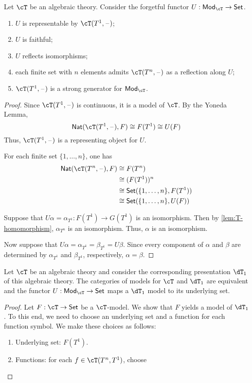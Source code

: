 \documentclass{amsart}
\begin{document}
\begin{lem}
  Let $\cT$ be an algebraic theory.
  Consider the forgetful functor $U : \mathsf{Mod}_{\cT} \to \mathsf{Set}$.
  \begin{enumerate}
  \item $U$ is representable by $\cT(T^{1}, \blank)$;
  \item $U$ is faithful;
  \item $U$ reflects isomorphisms;
  \item each finite set with $n$ elements admits $\cT(T^{n}, \blank)$ as a reflection along $U$;
  \item $\cT(T^{1}, \blank)$ is a strong generator for $\mathsf{Mod}_{\cT}$.
  \end{enumerate}
\end{lem}
\begin{proof}
  Since $\cT(T^{1},\blank)$ is continuous, it is a model of $\cT$.
  By the Yoneda Lemma,
  \[
    \mathsf{Nat}(\cT(T^{1}, \blank), F) \iso F(T^{1}) \iso U(F)
  \]
  Thus, $\cT(T^{1},\blank)$ is a representing object for $U$.

  For each finite set $\{1,\ldots,n\}$, one has
  \begin{align}
    \mathsf{Nat}(\cT(T^{n},\blank), F) &\iso F(T^{n})\\
                                       &\iso (F(T^{1}))^{n}\\
                                       &\iso \mathsf{Set}(\{1,\ldots,n\}, F(T^{1}))\\
                                       &\iso \mathsf{Set}(\{1,\ldots,n\}, U(F))
  \end{align}

  Suppose that $U\alpha = \alpha_{T^{1}} : F(T^{1}) \to G(T^{1})$ is an isomorphism.
  Then by \cref{lem:T-homomorphism}, $\alpha_{T^{n}}$ is an isomorphism.
  Thus, $\alpha$ is an isomorphism.

  Now suppose that $U\alpha = \alpha_{T^{1}} = \beta_{T^{1}} = U\beta$.
  Since every component of $\alpha$ and $\beta$ are determined by $\alpha_{T^{1}}$ and $\beta_{T^{1}}$, respectively, $\alpha = \beta$.
\end{proof}

\begin{lem}
  Let $\cT$ be an algebraic theory and consider the corresponding presentation $\dT_{1}$ of this algebraic theory.
  The categories of models for $\cT$ and $\dT_{1}$ are equivalent and the functor $U : \mathsf{Mod}_{\cT} \to \mathsf{Set}$ maps a $\dT_{1}$ model to its underlying set.
\end{lem}
\begin{proof}
  Let $F : \cT \to \mathsf{Set}$ be a $\cT$-model.
  We show that $F$ yields a model of $\dT_{1}$.
  To this end, we need to choose an underlying set and a function for each function symbol.
  We make these choices as follows:
  \begin{enumerate}
  \item Underlying set: $F(T^{1})$.
  \item Functions: for each $f \in \cT(T^{n},T^{1})$, choose
    
  \end{enumerate}
  
\end{proof}
\end{document}
